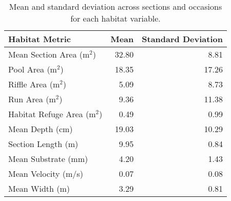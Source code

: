\begin{table}[ht]
\centering
\caption{Mean and standard deviation across sections and occasions for each habitat variable.} 
\label{tab:habitat}
\begin{tabular}{lrr}
  \hline
Habitat Metric & Mean & Standard Deviation \\ 
  \hline
Mean Section Area (m$^2$) & 32.80 & 8.81 \\ 
  Pool Area (m$^2$) & 18.35 & 17.26 \\ 
  Riffle Area (m$^2$) & 5.09 & 8.73 \\ 
  Run Area (m$^2$) & 9.36 & 11.38 \\ 
  Habitat Refuge Area (m$^2$) & 0.49 & 0.99 \\ 
  Mean Depth (cm) & 19.03 & 10.29 \\ 
  Section Length (m) & 9.95 & 0.84 \\ 
  Mean Substrate (mm) & 4.20 & 1.43 \\ 
  Mean Velocity (m/s) & 0.07 & 0.08 \\ 
  Mean Width (m) & 3.29 & 0.81 \\ 
   \hline
\end{tabular}
\end{table}
